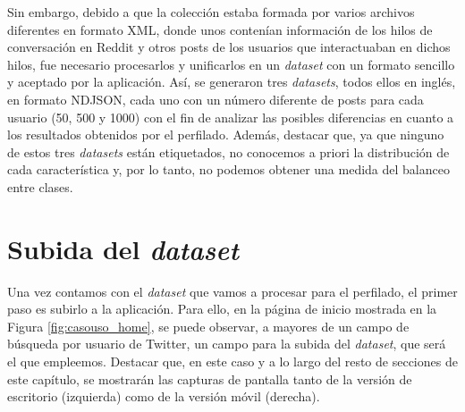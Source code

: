 \bigskip
Sin embargo, debido a que la colección estaba formada por varios archivos diferentes en formato XML, donde unos contenían información de los hilos
de conversación en Reddit y otros posts de los usuarios que interactuaban en dichos hilos, fue necesario procesarlos y unificarlos
en un \textit{dataset} con un formato sencillo y aceptado por la aplicación. Así, se generaron tres \textit{datasets}, todos ellos
en inglés, en formato NDJSON, cada uno con 
un número diferente de posts para cada usuario (50, 500 y 1000) con el fin de analizar las posibles diferencias en cuanto a los resultados
obtenidos por el perfilado. Además, destacar que, ya que ninguno de estos tres \textit{datasets} están etiquetados, no conocemos a priori 
la distribución de cada característica y, por lo tanto, no podemos obtener una medida del balanceo entre clases.

\section{Subida del \textit{dataset}}
\label{sec:casouso_subida_dataset}

Una vez contamos con el \textit{dataset} que vamos a procesar para el perfilado, el primer paso es subirlo a la aplicación. Para ello,
en la página de inicio mostrada en la Figura \ref{fig:casouso_home}, se puede observar, a mayores de un
campo de búsqueda por usuario de Twitter, un campo para la subida del \textit{dataset}, que será el que empleemos.
Destacar que, en este caso y a lo largo del resto de secciones de este capítulo,
se mostrarán las capturas de pantalla tanto de la versión de escritorio (izquierda) como de la versión móvil (derecha).

